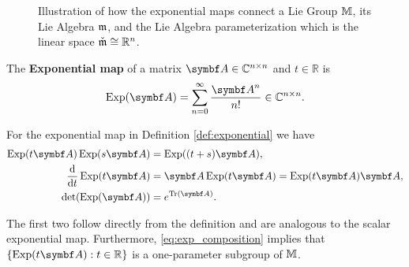 \begin{figure}
  \begin{center}
  \end{center}
  \caption{Illustration of how the exponential maps connect a Lie Group $\mathbb{M}$, its Lie Algebra $\mathfrak{m}$, and the Lie Algebra parameterization which is the linear space $\check{\mathfrak{m}} \cong \mathbb{R}^n$.}
  \label{fig:exponentials}
\end{figure}


\begin{definition}
  \label{def:exponential}
  The \textbf{Exponential map} of a matrix $\A \in \mathbb{C}^{n \times n}$ and $t \in \mathbb{R}$ is
  \begin{equation}
    \Exp(\A) = \sum_{n = 0}^\infty \frac{\A^n}{n!} \in \mathbb{C}^{n \times n}.
  \end{equation}
\end{definition}

\begin{properties}[title=Properties of the exponential map]
  For the exponential map in Definition \ref{def:exponential} we have
  \begin{subequations}
    \begin{align}
      \Exp(t \A) \Exp (s \A)                    & = \Exp((t+s) \A), \label{eq:exp_composition} \\
      \frac{\mathrm{d}}{\mathrm{d}t} \Exp(t \A) & = \A \Exp(t \A) = \Exp(t \A) \A,             \\
      \det (\Exp (\A))                          & = e^{\tr (\A)}. \label{eq:jacobi_identity}
    \end{align}
  \end{subequations}
\end{properties}
The first two follow directly from the definition and are analogous to the scalar exponential map. Furthermore, \eqref{eq:exp_composition} implies that $\{ \Exp(t \A) : t \in \mathbb{R} \}$ is a one-parameter subgroup of $\mathbb{M}$.

